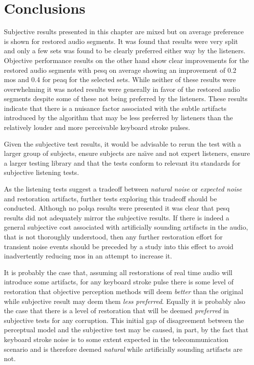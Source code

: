\section{Conclusions}\label{sec:RestorationResults}
Subjective results presented in this chapter are mixed but on average preference is shown for restored audio segments. It was found that results were very split and only a few sets was found to be clearly preferred either way by the listeners. Objective performance results on the other hand show clear improvements for the restored audio segments with \gls{pesq} on average showing an improvement of 0.2 \gls{mos} and 0.4 for \gls{peaq} for the selected sets. While neither of these results were overwhelming it was noted results were generally in favor of the restored audio segments despite some of these not being preferred by the listeners. These results indicate that there is a nuisance factor associated with the subtle artifacts introduced by the algorithm that may be less preferred by listeners than the relatively louder and more perceivable keyboard stroke pulses.

\label{corrections:conclusionSubjective}Given the subjective test results, it would be advisable to rerun the test with a larger group of subjects, ensure subjects are na\"{\i}ve and not expert listeners, ensure a larger testing library and that the tests conform to relevant \gls{itu} standards for subjective listening tests.

As the listening tests suggest a tradeoff between \emph{natural noise} or \emph{expected noise} and restoration artifacts, further tests exploring this tradeoff should be conducted. Although no \gls{polqa} results were presented it was clear that \gls{pesq} results did not adequately mirror the subjective results. If there is indeed a general subjective cost associated with artificially sounding artifacts in the audio, that is not thoroughly understood, then any further restoration effort for transient noise events should be preceded by a study into this effect to avoid inadvertently reducing \gls{mos} in an attempt to increase it.

It is probably the case that, assuming all restorations of real time audio will introduce some artifacts, for any keyboard stroke pulse there is some level of restoration that objective perception methods will deem \emph{better} than the original while subjective result may deem them \emph{less preferred}. Equally it is probably also the case that there is a level of restoration that will be deemed \emph{preferred} in subjective tests for any corruption. This initial gap of disagreement between the perceptual model and the subjective test may be caused, in part, by the fact that keyboard stroke noise is to some extent expected in the telecommunication scenario and is therefore deemed \emph{natural} while artificially sounding artifacts are not.


